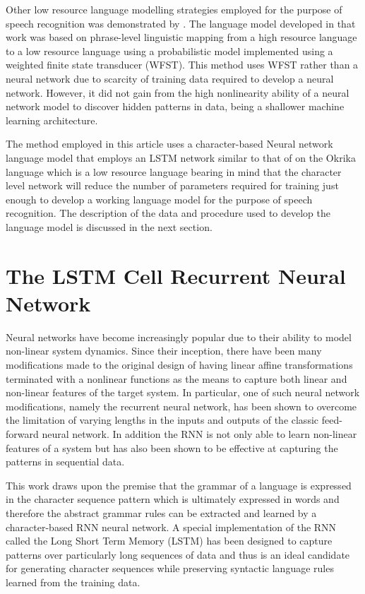 \documentclass[a4paper]{article}
\begin{document}
Other low resource language modelling strategies employed for the purpose of speech recognition was demonstrated by \cite{xu2013cross}.  The language model developed in that work was based on phrase-level linguistic mapping from a high resource language to a low resource language using a probabilistic model implemented using a weighted finite state transducer (WFST). This method uses WFST rather than a neural network due to scarcity of training data required to develop a neural network. However, it did not gain from the high nonlinearity ability of a neural network model to discover hidden patterns in data, being a shallower machine learning architecture.

The method employed in this article uses a character-based Neural network language model that employs an LSTM network similar to that of \cite{kim2016character} on the Okrika language which is a low resource language bearing in mind that the character level network will reduce the number of parameters required for training just enough to develop a working language model for the purpose of speech recognition.  The description of the data and procedure used to develop the language model is discussed in the next section. 

\section{The LSTM Cell Recurrent Neural Network}


Neural networks have become increasingly popular due to their ability to model non-linear system dynamics. Since their inception, there have been many modifications made to the original design of having linear affine transformations terminated with a nonlinear functions as the means to capture both linear and non-linear features of the target system. In particular, one of such neural network  modifications, namely the recurrent neural network, has been shown to overcome the limitation of varying lengths in the inputs and outputs of the classic feed-forward neural network.  In addition the RNN is not only able to learn non-linear features of a system but has also been shown to be effective at capturing the patterns in sequential data.

This work draws upon the premise that the grammar of a language is expressed in the character sequence pattern which is ultimately expressed in words and therefore the abstract grammar rules can be extracted and learned by a character-based RNN neural network.  A special implementation of the RNN called the Long Short Term Memory (LSTM) has been designed to capture patterns over particularly long sequences of data and thus is an ideal candidate for generating character sequences while preserving syntactic language rules learned from the training data.
\end{document}
